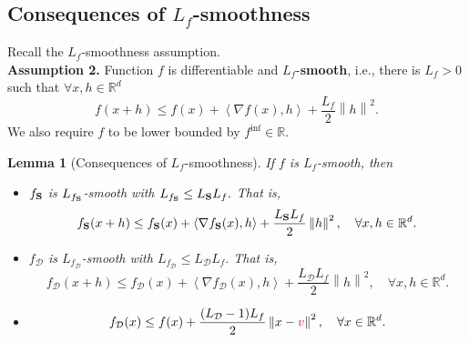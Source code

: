 \documentclass{article}
\newcommand{\ve}[2]{\left\langle #1 ,  #2 \right\rangle}
\newcommand{\shift}{{\color{purple}s}}
\newcommand{\bb}{\mathbb}
\newcommand{\R}{\bb R}
\newcommand{\norm}[1]{\left\| #1 \right\|}
\newtheorem{lemma}{Lemma}
\theoremstyle{plain}
\newcommand{\tf}{f_{\mathcal{D}}}
\renewcommand{\shift}{{\color{purple}v}}
\newcommand{\mS}{{\bf S}}
\theoremstyle{plain}
\theoremstyle{definition}
\theoremstyle{remark}
\begin{document}
\subsection{Consequences of $L_f$-smoothness}
Recall the $L_f$-smoothness assumption.\\
\noindent\textbf{Assumption 2.} Function $f$ is differentiable and $L_f$-\textbf{smooth}, i.e., there is $L_f>0$ such that $\forall x, h \in \R^d$
	\[f(x+h) \leq f(x) + \ve{\nabla f(x)}{h} + \frac{L_f}{2}\norm{h}^2.\]
We also require $f$ to be lower bounded by $f^{\inf} \in \mathbb{R}$.
\begin{lemma}[Consequences of $L_f$-smoothness]\label{lemma:smoothness_appendix} If $f$ is $L_f$-smooth, then
	\begin{itemize}
		\item[(i)] $f_{\mS}$ is $L_{f_\mS}$-smooth with $L_{f_\mS} \leq L_{\mS} L_f.$ That is,
		\[ f_{\mS}(x+h) \leq f_{\mS}(x) + \ve{\nabla f_{\mS}(x)}{h} + \frac{L_{\mS} L_f }{2} \norm{h}^2, \quad \forall x, h \in \R^{d}. \]

		\item[(ii)]
		$\tf$ is $L_{\tf}$-smooth with $L_{\tf}\leq L_{\mathcal{D}} L_f.$ That is,
		\[\tf(x+h) \leq \tf(x) + \ve{\nabla \tf(x)}{h} + \frac{L_{\mathcal{D}} L_f }{2} \norm{h}^2, \quad \forall x, h \in \R^{d}. \]

		\item[(iii)]
		\begin{equation}\label{eq:L_f-smooth-iii_appendix}
			\tf(x) \leq f(x) + \frac{(L_{\mathcal{D}}-1) L_f}{2} \norm{x-\shift}^2,\quad \forall x\in \R^d.
		\end{equation}

	\end{itemize}

\end{lemma}
\end{document}
